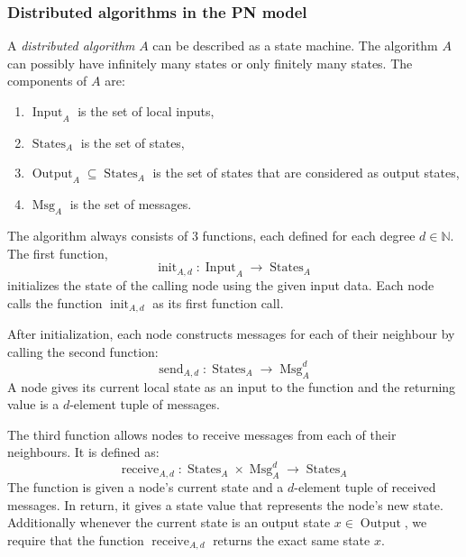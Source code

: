 \subsubsection{Distributed algorithms in the PN model}

\newcommand{\algin}{\operatorname{Input}}
\newcommand{\algstates}{\operatorname{States}}
\newcommand{\algout}{\operatorname{Output}}
\newcommand{\algmsg}{\operatorname{Msg}}

\newcommand{\alginit}{\operatorname{init}}
\newcommand{\algsend}{\operatorname{send}}
\newcommand{\algrecv}{\operatorname{receive}}

A \emph{distributed algorithm} $A$ can be described as a state machine.
The algorithm $A$ can possibly have infinitely many states or only finitely many states.
The components of $A$ are:
\begin{enumerate}
  \item $\algin_A$ is the set of local inputs,
  \item $\algstates_A$ is the set of states,
  \item $\algout_A \subseteq \algstates_A$ is the set of states that are considered as output states,
  \item $\algmsg_A$ is the set of messages.
\end{enumerate}

The algorithm always consists of 3 functions, each defined for each degree $d \in \mathbb{N}$.
The first function, $$\alginit_{A,d}\colon \algin_A \rightarrow \algstates_A$$ initializes the state of the calling node using the given input data.
Each node calls the function $\alginit_{A,d}$ as its first function call.

After initialization, each node constructs messages for each of their neighbour by calling the second function:
$$\algsend_{A,d}\colon \algstates_A \rightarrow \algmsg_A^d$$
A node gives its current local state as an input to the function and the returning value is a $d$-element tuple of messages.

The third function allows nodes to receive messages from each of their neighbours.
It is defined as:
$$\algrecv_{A,d}\colon \algstates_A \times \algmsg_A^d \rightarrow \algstates_A$$
The function is given a node's current state and a $d$-element tuple of received messages.
In return, it gives a state value that represents the node's new state.
Additionally whenever the current state is an output state $x \in \algout$, we require that the function $\algrecv_{A,d}$ returns the exact same state $x$.

